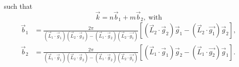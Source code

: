 such that 
\begin{equation}
\vec{k} =  n \vec{b}_1  + m \vec{b}_2,\; \text{with}
\end{equation}
\begin{align} \label{k.quant.eq}
\vec{b}_1 &= \frac{2 \pi}{ (\vec{L}_1 \cdot \vec{g}_1)  (\vec{L}_2 \cdot  \vec{g}_2 )  - (\vec{L}_1 \cdot \vec{g}_2) (\vec{L}_2  \cdot \vec{g_1} ) }   \left[  (\vec{L}_2 \cdot  \vec{g}_2) \vec{g}_1 -   (\vec{L}_2  \cdot \vec{g_1} ) \vec{g}_2 \right], \nonumber \\ 
\vec{b}_2 &= \frac{2 \pi}{ (\vec{L}_1 \cdot \vec{g}_1)  (\vec{L}_2 \cdot  \vec{g}_2 )  - (\vec{L}_1 \cdot \vec{g}_2) (\vec{L}_2  \cdot \vec{g_1} ) }   
\left[  (\vec{L}_1 \cdot  \vec{g}_1) \vec{g}_2 -   (\vec{L}_1  \cdot \vec{g_2} ) \vec{g}_1 \right].
\end{align}

